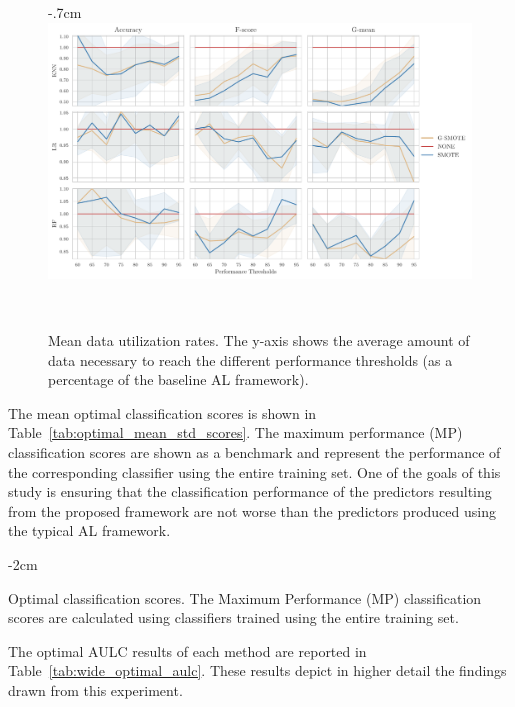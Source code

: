 \documentclass[preprint,12pt]{elsarticle}
\begin{document}
\begin{figure}[H]
	\centering
    \addtolength{\leftskip} {-.7cm}
    \addtolength{\rightskip}{-2cm}
	\includegraphics[width=1.2\linewidth]{../analysis/data_utilization_rate}
    \caption{Mean data utilization rates. The y-axis shows the average amount
    of data necessary to reach the different performance thresholds (as a
    percentage of the baseline AL framework).}~\label{fig:dur}
\end{figure}

The mean optimal classification scores is shown in
Table~\ref{tab:optimal_mean_std_scores}. The maximum performance (MP)
classification scores are shown as a benchmark and represent the performance
of the corresponding classifier using the entire training set. One of the
goals of this study is ensuring that the classification performance of the
predictors resulting from the proposed framework are not worse than the
predictors produced using the typical AL framework.

\begin{table}[H]
    \centering
    \addtolength{\leftskip} {-2cm}
    \addtolength{\rightskip}{-2cm}
    \caption{\label{tab:optimal_mean_std_scores}
        Optimal classification scores. The Maximum Performance (MP)
        classification scores are calculated using classifiers trained using
        the entire training set.
    }
\end{table}

The optimal AULC results of each method are reported in
Table~\ref{tab:wide_optimal_aulc}. These results depict in higher detail the
findings drawn from this experiment.
\end{document}
